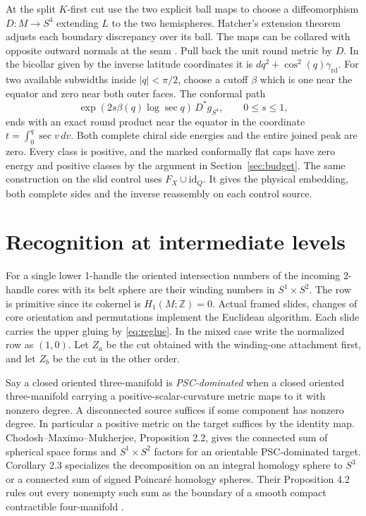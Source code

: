 \documentclass[11pt,letterpaper]{article}
\numberwithin{equation}{section}
\theoremstyle{remark}
\newcommand{\rd}{\gamma_{\mathrm{rd}}}
\begin{document}
At the split \(K\)-first cut use the two explicit ball maps to
choose a diffeomorphism \(D:M\to S^4\) extending \(L\) to the
two hemispheres. Hatcher's extension theorem adjusts each
boundary discrepancy over its ball. The maps can be collared
with opposite outward normals at the seam
\cite[p.~553]{Hatcher1983Smale}. Pull back the unit round metric
by \(D\). In the bicollar given by the inverse latitude
coordinates it is \(dq^2+\cos^2(q)\rd\). For two available
subwidths inside \(|q|<\pi/2\), choose a cutoff \(\beta\)
which is one near the equator and zero near both outer faces.
The conformal path
\[
 \exp(2s\beta(q)\log\sec q)\,D^*g_{S^4},
 \qquad 0\le s\le1 ,
\]
ends with an exact round product near the equator in the
coordinate \(t=\int_0^q\sec v\,dv\). Both complete chiral side
energies and the entire joined peak are zero. Every class
is positive, and the marked conformally flat caps have zero
energy and positive classes by the argument in
Section~\ref{sec:budget}. The same construction on the slid
control uses \(F_X\cup\mathrm{id}_Q\). It gives the physical
embedding, both complete sides and the inverse reassembly on
each control source.

\section{Recognition at intermediate levels}\label{sec:psc}
For a single lower 1-handle the oriented intersection numbers of
the incoming 2-handle cores with its belt sphere are their winding
numbers in \(S^1\times S^2\). The row is primitive since its cokernel
is \(H_1(M;\mathbb Z)=0\). Actual framed slides, changes of core
orientation and permutations implement the Euclidean algorithm.
Each slide carries the upper gluing by \eqref{eq:reglue}.
In the mixed case write the normalized row as \((1,0)\).
Let \(Z_a\) be the cut obtained with the winding-one attachment first,
and let \(Z_b\) be the cut in the other order.

Say a closed oriented three-manifold is \emph{PSC-dominated} when
a closed oriented three-manifold carrying a positive-scalar-curvature
metric maps to it with nonzero degree. A disconnected source suffices
if some component has nonzero degree. In particular a positive metric
on the target suffices by the identity map. Chodosh--Maximo--Mukherjee,
Proposition 2.2, gives the connected sum of spherical space forms
and \(S^1\times S^2\) factors for an orientable PSC-dominated target.
Corollary 2.3 specializes the decomposition on an integral homology
sphere to \(S^3\) or a connected sum of signed Poincar\'e homology spheres.
Their Proposition 4.2 rules out every nonempty such sum as the boundary
of a smooth compact contractible four-manifold
\cite[Proposition 2.2, Corollary 2.3 and Proposition 4.2]{ChodoshMaximoMukherjee2024Complete}.
\end{document}
